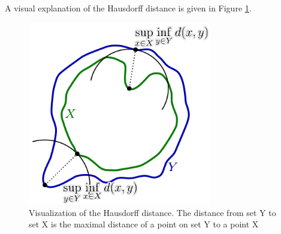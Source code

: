 A visual explanation of the Hausdorff distance is given in Figure \ref{hausdorff_distance}.

\begin{figure}[H]
\centering
\includegraphics[width=8cm]{chapters/06_hdm/images/hausdorff_distance.png}
\caption{Visualization of the Hausdorff distance. The distance from set Y to set X is the maximal distance of a point on set Y to a point X \cite{hausdorffdistanceimage}}
\label{hausdorff_distance}
\end{figure}

